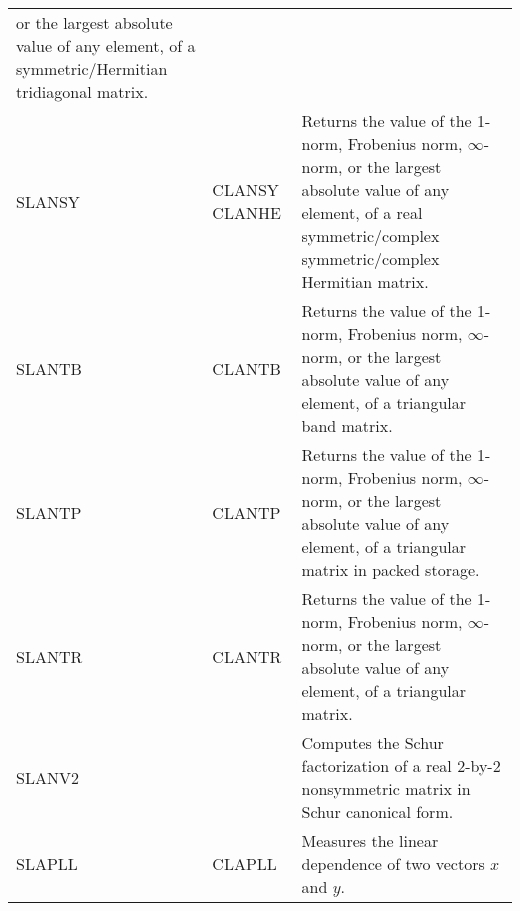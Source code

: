 \begin{center}
\begin{tabular}{| l p{0.75in} |p{4.5in}    |}
or the largest absolute value of any element,
of a symmetric/Hermitian tridiagonal matrix.\\
SLANSY&CLANSY CLANHE&
Returns the value of the 1-norm, Frobenius norm, $\infty$-norm,  
or the largest absolute value of any element,
of a real symmetric/complex symmetric/complex Hermitian matrix.\\
SLANTB&CLANTB&  
Returns the value of the 1-norm, Frobenius norm, $\infty$-norm,  
or the largest absolute value of any element,
of a triangular band matrix.\\
SLANTP&CLANTP&  
Returns the value of the 1-norm, Frobenius norm, $\infty$-norm,  
or the largest absolute value of any element,
of a triangular matrix in packed storage.\\
SLANTR&CLANTR&  
Returns the value of the 1-norm, Frobenius norm, $\infty$-norm,  
or the largest absolute value of any element,
of a triangular matrix.\\
SLANV2&&
Computes the Schur factorization of a real 2-by-2 nonsymmetric matrix 
in Schur canonical form.\\
SLAPLL&CLAPLL&
Measures the linear dependence of two vectors $x$ and $y$.\\
\hline
\end{tabular}
\end{center}
